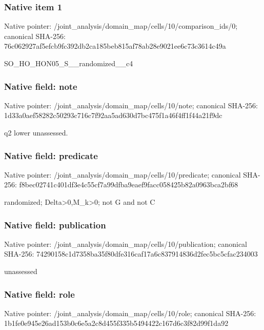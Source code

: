 \documentclass[10pt,a4paper]{article}
\begin{document}
\subsubsection{Native item 1}
Native pointer: /joint\_\allowbreak{}analysis/domain\_\allowbreak{}map/cells/10/comparison\_\allowbreak{}ids/0; canonical SHA-256: 76c062927af5efcb9fc392db2ca185beb815af78ab28e9021ee6c73c3614c49a

\begingroup\raggedright\sloppy SO\_\allowbreak{}HO\_\allowbreak{}HON05\_\allowbreak{}S\_\allowbreak{}\_\allowbreak{}randomized\_\allowbreak{}\_\allowbreak{}c4\par\endgroup

\subsubsection{Native field: note}
Native pointer: /joint\_\allowbreak{}analysis/domain\_\allowbreak{}map/cells/10/note; canonical SHA-256: 1d33a0aef58282c50293c716c7f92aa5ad630d7bc475f1a46f4ff1f44a21f9dc

\begingroup\raggedright\sloppy q2 lower unassessed.\par\endgroup

\subsubsection{Native field: predicate}
Native pointer: /joint\_\allowbreak{}analysis/domain\_\allowbreak{}map/cells/10/predicate; canonical SHA-256: f8bec02741c401df3e4c55cf7a99dfba9eaef9facc058425b82a0963bca2bf68

\begingroup\raggedright\sloppy randomized;\allowbreak{} Delta>0,\allowbreak{}M\_\allowbreak{}k>0;\allowbreak{} not G and not C\par\endgroup

\subsubsection{Native field: publication}
Native pointer: /joint\_\allowbreak{}analysis/domain\_\allowbreak{}map/cells/10/publication; canonical SHA-256: 74290158c1d7358ba35f80dfe316caf17a6c837914836d2fec5bc5cfac234003

\begingroup\raggedright\sloppy unassessed\par\endgroup

\subsubsection{Native field: role}
Native pointer: /joint\_\allowbreak{}analysis/domain\_\allowbreak{}map/cells/10/role; canonical SHA-256: 1b1fe0e945e26ad153b0c6e5a2c8d455f335b5494422c167d6c3f82d99f1da92
\end{document}
